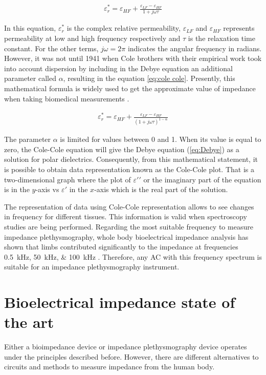 \begin{align}
\label{eq:Debye}
\varepsilon_r^* = \varepsilon_{HF} + \frac{\varepsilon_{LF} - \varepsilon_{HF}}{1 + j \omega \tau}
\end{align}

In this equation, $\varepsilon_r^*$ is the complex relative permeability, $\varepsilon_{LF}$ and $\varepsilon_{HF}$ represents permeability at low and high frequency respectively and $\tau$ is the relaxation time constant. For the other terms, $j \omega =2 \pi$ indicates the angular frequency in radians. However, it was not until 1941 when Cole brothers with their empirical work took into account dispersion by including in the Debye equation an additional parameter called $\alpha$, resulting in the equation \ref{eq:cole cole}. Presently, this mathematical formula is widely used to get the approximate value of impedance when taking biomedical measurements \cite{cole1941dispersion}.

\begin{align}
\label{eq:cole cole}
\varepsilon_r^* = \varepsilon_{HF} + \frac{\varepsilon_{LF} - \varepsilon_{HF}}{(1 + j \omega \tau)^{1-\alpha}}
\end{align}

The parameter $\alpha$ is limited for values between 0 and 1. When its value is equal to zero, the Cole-Cole equation will give the Debye equation (\ref{eq:Debye}) as a solution for polar dielectrics. Consequently, from this mathematical statement, it is possible to obtain data representation known as the Cole-Cole plot. That is a two-dimensional graph where the plot of $\varepsilon \prime\prime$ or the imaginary part of the equation is in the $y$-axis vs $\varepsilon \prime$ in the $x$-axis which is the real part of the solution. 

The representation of data using Cole-Cole representation allows to see changes in frequency for different tissues. This information is valid when spectroscopy studies are being performed. Regarding the most suitable frequency to measure impedance plethysmography, whole body bioelectrical impedance analysis has shown that limbs contributed significantly to the impedance at frequencies \SIlist{0.5; 50; 100}{\kHz} \cite{bracco1996segmental}. Therefore, any AC with this frequency spectrum is suitable for an impedance plethysmography instrument. 

\section{Bioelectrical impedance state of the art} %
\label{section impedance state art}
Either a bioimpedance device or impedance plethysmography device operates under the principles described before. However, there are different alternatives to circuits and methods to measure impedance from the human body.  

